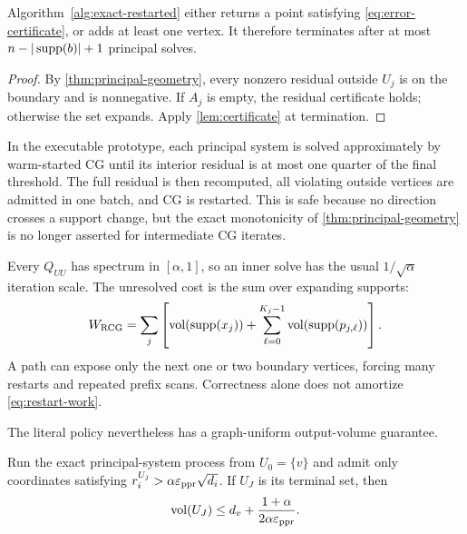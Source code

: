 \documentclass[11pt]{article}
\begin{document}
\begin{corollary}
\label{cor:principal-termination}
Algorithm~\ref{alg:exact-restarted} either returns a point satisfying
\cref{eq:error-certificate}, or adds at least one vertex. It therefore
terminates after at most $n-|\operatorname{supp}(b)|+1$ principal solves.
\end{corollary}

\begin{proof}
By \cref{thm:principal-geometry}, every nonzero residual outside $U_j$ is on
the boundary and is nonnegative. If $A_j$ is empty, the residual certificate
holds; otherwise the set expands. Apply \cref{lem:certificate} at
termination.
\end{proof}

In the executable prototype, each principal system is solved approximately
by warm-started CG until its interior residual is at most one quarter of the
final threshold. The full residual is then recomputed, all violating outside
vertices are admitted in one batch, and CG is restarted. This is safe because
no direction crosses a support change, but the exact monotonicity of
\cref{thm:principal-geometry} is no longer asserted for intermediate CG
iterates.

Every $Q_{UU}$ has spectrum in $[\alpha,1]$, so an inner solve has the usual
$1/\sqrt\alpha$ iteration scale. The unresolved cost is the sum over
expanding supports:
\begin{equation}
 W_{\rm RCG}
 =\sum_j\left[
   \operatorname{vol}(\operatorname{supp}(x_j))
   +\sum_{\ell=0}^{K_j-1}\operatorname{vol}(\operatorname{supp}(p_{j,\ell}))
 \right].
 \label{eq:restart-work}
\end{equation}
A path can expose only the next one or two boundary vertices, forcing many
restarts and repeated prefix scans. Correctness alone does not amortize
\cref{eq:restart-work}.

The literal policy nevertheless has a graph-uniform output-volume guarantee.

\begin{proposition}
\label{prop:violation-only-volume}
Run the exact principal-system process from $U_0=\{v\}$ and admit only
coordinates satisfying
$r^{U_j}_i>\alpha\varepsilon_{\mathrm{ppr}}\sqrt{d_i}$. If $U_J$ is its terminal set, then
\begin{equation}
 \operatorname{vol}(U_J)
 \leq d_v+\frac{1+\alpha}{2\alpha\varepsilon_{\mathrm{ppr}}}.
 \label{eq:violation-volume}
\end{equation}
\end{proposition}
\end{document}
